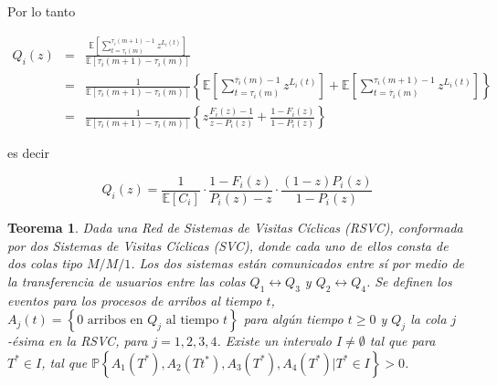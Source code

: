 \documentclass{article}
\newtheorem{Teo}{Teorema}[section]
\newcommand{\esp}{\mathbb{E}}
\newcommand{\prob}{\mathbb{P}}
\numberwithin{equation}{section}
\begin{document}
Por lo tanto

\begin{eqnarray*}
Q_{i}\left(z\right)&=&\frac{\esp\left[\sum_{t=\tau_{i}\left(m\right)}^{\tau_{i}
\left(m+1\right)-1}z^{L_{i}\left(t\right)}\right]}{\esp\left[\tau_{i}\left(m+1\right)-\tau_{i}\left(m\right)\right]}\\
&=&\frac{1}{\esp\left[\tau_{i}\left(m+1\right)-\tau_{i}\left(m\right)\right]}
\left\{
\esp\left[\sum_{t=\tau_{i}\left(m\right)}^{\overline{\tau}_{i}\left(m\right)-1}
z^{L_{i}\left(t\right)}\right]
+\esp\left[\sum_{t=\overline{\tau}_{i}\left(m\right)}^{\tau_{i}\left(m+1\right)-1}
z^{L_{i}\left(t\right)}\right]\right\}\\
&=&\frac{1}{\esp\left[\tau_{i}\left(m+1\right)-\tau_{i}\left(m\right)\right]}
\left\{
z\frac{F_{i}\left(z\right)-1}{z-P_{i}\left(z\right)}+\frac{1-F_{i}\left(z\right)}
{1-P_{i}\left(z\right)}
\right\}
\end{eqnarray*}

es decir

\begin{equation}
Q_{i}\left(z\right)=\frac{1}{\esp\left[C_{i}\right]}\cdot\frac{1-F_{i}\left(z\right)}{P_{i}\left(z\right)-z}\cdot\frac{\left(1-z\right)P_{i}\left(z\right)}{1-P_{i}\left(z\right)}
\end{equation}

\begin{Teo}
Dada una Red de Sistemas de Visitas C\'iclicas (RSVC), conformada por dos Sistemas de Visitas C\'iclicas (SVC), donde cada uno de ellos consta de dos colas tipo $M/M/1$. Los dos sistemas est\'an comunicados entre s\'i por medio de la transferencia de usuarios entre las colas $Q_{1}\leftrightarrow Q_{3}$ y $Q_{2}\leftrightarrow Q_{4}$. Se definen los eventos para los procesos de arribos al tiempo $t$, $A_{j}\left(t\right)=\left\{0 \textrm{ arribos en }Q_{j}\textrm{ al tiempo }t\right\}$ para alg\'un tiempo $t\geq0$ y $Q_{j}$ la cola $j$-\'esima en la RSVC, para $j=1,2,3,4$.  Existe un intervalo $I\neq\emptyset$ tal que para $T^{*}\in I$, tal que $\prob\left\{A_{1}\left(T^{*}\right),A_{2}\left(Tt^{*}\right),
A_{3}\left(T^{*}\right),A_{4}\left(T^{*}\right)|T^{*}\in I\right\}>0$.
\end{Teo}
\end{document}
